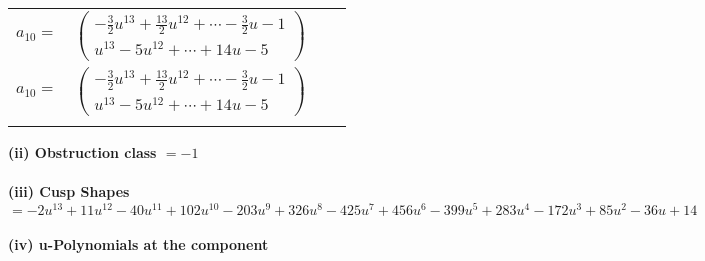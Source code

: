 \documentclass[1p]{elsarticle_modified}
\theoremstyle{definition}
\begin{document}
\begin{tabular}{m{7pt} m{180pt} m{7pt} m{180pt} }
\flushright $a_{10}=$&$\begin{pmatrix}-\frac{3}{2} u^{13}+\frac{13}{2} u^{12}+\cdots-\frac{3}{2} u-1\\u^{13}-5 u^{12}+\cdots+14 u-5\end{pmatrix}$\\ \flushright $a_{10}=$&$\begin{pmatrix}-\frac{3}{2} u^{13}+\frac{13}{2} u^{12}+\cdots-\frac{3}{2} u-1\\u^{13}-5 u^{12}+\cdots+14 u-5\end{pmatrix}$\\&\end{tabular}
\flushleft \textbf{(ii) Obstruction class $= -1$}\\~\\
\flushleft \textbf{(iii) Cusp Shapes $= -2 u^{13}+11 u^{12}-40 u^{11}+102 u^{10}-203 u^9+326 u^8-425 u^7+456 u^6-399 u^5+283 u^4-172 u^3+85 u^2-36 u+14$}\\~\\
\newpage\renewcommand{\arraystretch}{1}
\flushleft \textbf{(iv) u-Polynomials at the component}\newline \\
\end{document}
